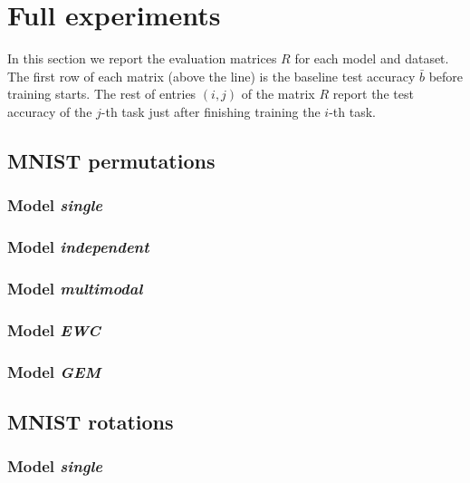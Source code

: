 \documentclass{article}
\begin{document}
\clearpage
\newpage
\section{Full experiments} \label{sec:app-r}
In this section we report the evaluation matrices $R$ for each model and
dataset.  The first row of each matrix (above the line) is the baseline test
accuracy $\bar{b}$ before training starts. The rest of entries $(i,j)$ of the
matrix $R$ report the test accuracy of the $j$-th task just after finishing
training the $i$-th task.

\subsection{MNIST permutations}
\subsubsection{Model \emph{single}}
{\tiny {}}
\subsubsection{Model \emph{independent}}
{\tiny {}}
\newpage
\subsubsection{Model \emph{multimodal}}
{\tiny {}}
\subsubsection{Model \emph{EWC}}
{\tiny {}}
\subsubsection{Model \emph{GEM}}
{\tiny {}}

\subsection{MNIST rotations}
\subsubsection{Model \emph{single}}
{\tiny {}}
\end{document}
